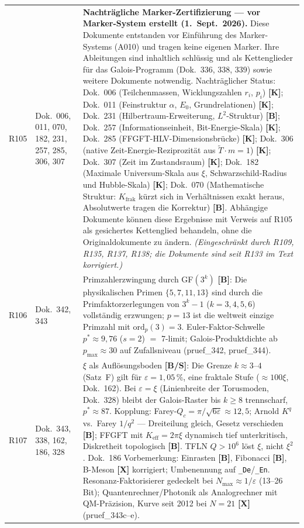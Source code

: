 \begin{longtable}{@{}p{0.9cm}p{3.1cm}p{10.2cm}@{}}
R105 & Dok.~006, 011, 070, 182, 231, 257, 285, 306, 307 & \textbf{Nachträgliche Marker-Zertifizierung — vor Marker-System erstellt (1.~Sept.~2026).} Diese Dokumente entstanden vor Einführung des Marker-Systems (A010) und tragen keine eigenen Marker. Ihre Ableitungen sind inhaltlich schlüssig und als Kettenglieder für das Galois-Programm (Dok.~336, 338, 339) sowie weitere Dokumente notwendig. Nachträglicher Status: Dok.~006 (Teilchenmassen, Wicklungszahlen $r_i$, $p_i$) \textbf{[K]}; Dok.~011 (Feinstruktur $\alpha$, $E_0$, Grundrelationen) \textbf{[K]}; Dok.~231 (Hilbertraum-Erweiterung, $L^2$-Struktur) \textbf{[B]}; Dok.~257 (Informationseinheit, Bit-Energie-Skala) \textbf{[K]}; Dok.~285 (FFGFT-HLV-Dimensionsbrücke) \textbf{[K]}; Dok.~306 (native Zeit-Energie-Reziprozität aus $\tilde{T}\cdot m=1$) \textbf{[K]}; Dok.~307 (Zeit im Zustandsraum) \textbf{[K]}; Dok.~182 (Maximale Universum-Skala aus $\xi$, Schwarzschild-Radius und Hubble-Skala) \textbf{[K]}; Dok.~070 (Mathematische Struktur: $K_\text{frak}$ kürzt sich in Verhältnissen exakt heraus, Absolutwerte tragen die Korrektur) \textbf{[B]}. Abhängige Dokumente können diese Ergebnisse mit Verweis auf R105 als gesichertes Kettenglied behandeln, ohne die Originaldokumente zu ändern. \emph{(Eingeschränkt durch R109, R135, R137, R138; die Dokumente sind seit R133 im Text korrigiert.)} \\
R106 & Dok.~342, 343 & Primzahlerzwingung durch GF$(3^k)$ \textbf{[B]}: Die physikalischen Primen $\{5,7,11,13\}$ sind durch die Primfaktorzerlegungen von $3^k-1$ ($k=3,4,5,6$) vollständig erzwungen; $p=13$ ist die weltweit einzige Primzahl mit $\text{ord}_p(3)=3$. Euler-Faktor-Schwelle $p^*\approx9{,}76$ ($s=2$) $=$ 7-limit; Galois-Produktdichte ab $p_\text{max}\approx30$ auf Zufallsniveau (pruef\_342, pruef\_344). \\
R107 & Dok.~343, 338, 162, 186, 328 & $\xi$ als Auflösungsboden \textbf{[B/S]}: Die Grenze $k\approx3$--$4$ (Satz~F) gilt für $\varepsilon=1{,}05\,\%$, eine fraktale Stufe ($\approx100\xi$, Dok.~162). Bei $\varepsilon=\xi$ (Linienbreite der Torusmoden, Dok.~328) bleibt der Galois-Raster bis $k\geq8$ trennscharf, $p^*\approx87$. Kopplung: Farey-$Q_c=\pi/\sqrt{6\varepsilon}\approx12{,}5$; Arnold $K^q$ vs.\ Farey $1/q^2$ --- Dreiteilung gleich, Gesetz verschieden \textbf{[B]}; FFGFT mit $K_\text{eff}=2\pi\xi$ dynamisch tief unterkritisch, Diskretheit topologisch \textbf{[B]}. TFLN $Q>10^6$ löst $\xi$, nicht $\xi^2$. Dok.~186 Vorbemerkung: Einrasten \textbf{[B]}, Fibonacci \textbf{[B]}, B-Meson \textbf{[X]} korrigiert; Umbenennung auf \texttt{\_De}/\texttt{\_En}. Resonanz-Faktorisierer gedeckelt bei $N_\text{max}\approx1/\varepsilon$ (13--26 Bit); Quantenrechner/Photonik als Analogrechner mit QM-Präzision, Kurve seit 2012 bei $N=21$ \textbf{[X]} (pruef\_343c--e). \\

\end{longtable}
